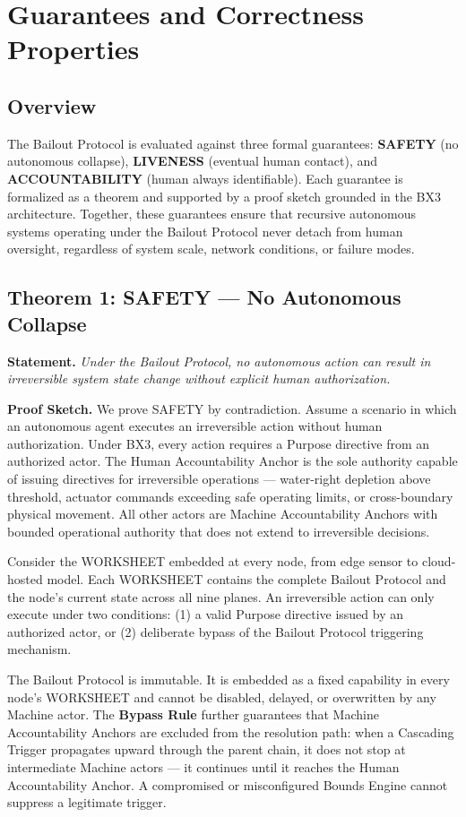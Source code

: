 \section{Guarantees and Correctness Properties}

\subsection{Overview}
The Bailout Protocol is evaluated against three formal guarantees: \textbf{SAFETY} (no autonomous collapse), \textbf{LIVENESS} (eventual human contact), and \textbf{ACCOUNTABILITY} (human always identifiable). Each guarantee is formalized as a theorem and supported by a proof sketch grounded in the BX3 architecture. Together, these guarantees ensure that recursive autonomous systems operating under the Bailout Protocol never detach from human oversight, regardless of system scale, network conditions, or failure modes.

\subsection{Theorem 1: SAFETY --- No Autonomous Collapse}
\textbf{Statement.} \emph{Under the Bailout Protocol, no autonomous action can result in irreversible system state change without explicit human authorization.}

\textbf{Proof Sketch.}
We prove SAFETY by contradiction. Assume a scenario in which an autonomous agent executes an irreversible action without human authorization. Under BX3, every action requires a Purpose directive from an authorized actor. The Human Accountability Anchor is the sole authority capable of issuing directives for irreversible operations --- water-right depletion above threshold, actuator commands exceeding safe operating limits, or cross-boundary physical movement. All other actors are Machine Accountability Anchors with bounded operational authority that does not extend to irreversible decisions.

Consider the WORKSHEET embedded at every node, from edge sensor to cloud-hosted model. Each WORKSHEET contains the complete Bailout Protocol and the node's current state across all nine planes. An irreversible action can only execute under two conditions: (1) a valid Purpose directive issued by an authorized actor, or (2) deliberate bypass of the Bailout Protocol triggering mechanism.

The Bailout Protocol is immutable. It is embedded as a fixed capability in every node's WORKSHEET and cannot be disabled, delayed, or overwritten by any Machine actor. The \textbf{Bypass Rule} further guarantees that Machine Accountability Anchors are excluded from the resolution path: when a Cascading Trigger propagates upward through the parent chain, it does not stop at intermediate Machine actors --- it continues until it reaches the Human Accountability Anchor. A compromised or misconfigured Bounds Engine cannot suppress a legitimate trigger.

